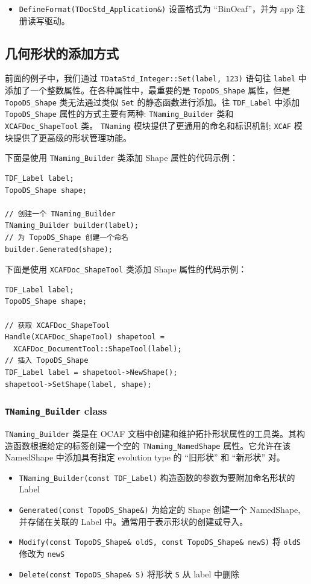 \documentclass[11pt]{article}
\begin{document}
\begin{itemize}
\item \texttt{DefineFormat(TDocStd\_Application\&)} 设置格式为 ``BinOcaf''，并为 app 注册读写驱动。
\end{itemize}
\subsection{几何形状的添加方式}
\label{sec:org477ea08}

前面的例子中，我们通过 \texttt{TDataStd\_Integer::Set(label, 123)} 语句往 \texttt{label} 中添加了一个整数属性。在各种属性中，最重要的是 \texttt{TopoDS\_Shape} 属性，但是 \texttt{TopoDS\_Shape} 类无法通过类似 \texttt{Set} 的静态函数进行添加。往 \texttt{TDF\_Label} 中添加 \texttt{TopoDS\_Shape} 属性的方式主要有两种: \texttt{TNaming\_Builder} 类和 \texttt{XCAFDoc\_ShapeTool} 类。 \texttt{TNaming} 模块提供了更通用的命名和标识机制; \texttt{XCAF} 模块提供了更高级的形状管理功能。

下面是使用 \texttt{TNaming\_Builder} 类添加 Shape 属性的代码示例：

\begin{verbatim}
TDF_Label label;
TopoDS_Shape shape;

// 创建一个 TNaming_Builder
TNaming_Builder builder(label);
// 为 TopoDS_Shape 创建一个命名
builder.Generated(shape);
\end{verbatim}

下面是使用 \texttt{XCAFDoc\_ShapeTool} 类添加 Shape 属性的代码示例：

\begin{verbatim}
TDF_Label label;
TopoDS_Shape shape;

// 获取 XCAFDoc_ShapeTool
Handle(XCAFDoc_ShapeTool) shapetool =
  XCAFDoc_DocumentTool::ShapeTool(label);
// 插入 TopoDS_Shape
TDF_Label label = shapetool->NewShape();
shapetool->SetShape(label, shape);
\end{verbatim}
\subsubsection{\texttt{TNaming\_Builder} class}
\label{sec:org81ee308}

\texttt{TNaming\_Builder} 类是在 OCAF 文档中创建和维护拓扑形状属性的工具类。其构造函数根据给定的标签创建一个空的 \texttt{TNaming\_NamedShape} 属性。它允许在该 NamedShape 中添加具有指定 evolution type 的 ``旧形状'' 和 ``新形状'' 对。

\begin{itemize}
\item \texttt{TNaming\_Builder(const TDF\_Label)} 构造函数的参数为要附加命名形状的 Label
\item \texttt{Generated(const TopoDS\_Shape\&)} 为给定的 Shape 创建一个 NamedShape, 并存储在关联的 Label 中。通常用于表示形状的创建或导入。
\item \texttt{Modify(const TopoDS\_Shape\& oldS, const TopoDS\_Shape\& newS)} 将 \texttt{oldS} 修改为 \texttt{newS}
\item \texttt{Delete(const TopoDS\_Shape\& S)} 将形状 \texttt{S} 从 label 中删除
\end{itemize}
\end{document}
